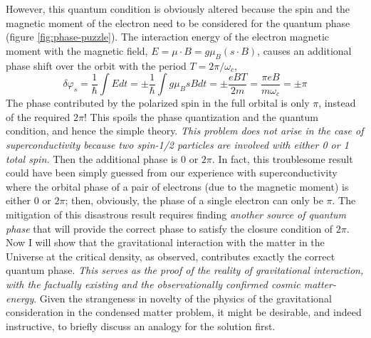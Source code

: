 \documentclass[aps,preprint,12pt,tightenlines]{revtex4}%
\begin{document}
However, this quantum condition is obviously altered because the spin and the
magnetic moment of the electron need to be considered for the quantum phase
(figure \ref{fig:phase-puzzle}). The interaction energy of the electron magnetic
moment with the magnetic field, $E=\mu\cdot B=g\mu_{B}\left(  s\cdot B\right)
$, causes an additional phase shift over the orbit with the period
$T=2\pi/\omega_{c},$%
\begin{equation}
\delta\varphi_{s}=\frac{1}{\hbar}\int Edt=\pm\frac{1}{\hbar}\int g\mu
_{B}sBdt=\pm\frac{eBT}{2m}=\frac{\pi eB}{m\omega_{c}}=\pm\pi
\end{equation}
The phase contributed by the polarized spin in the full orbital is only $\pi$,
instead of the required $2\pi$! This spoils the phase quantization and the
quantum condition, and hence the simple theory. \emph{This problem does not
arise in the case of superconductivity because two spin-1/2 particles are
involved with either 0 or 1 total spin.} Then the additional phase is 0 or
$2\pi$. In fact, this troublesome result could have been simply guessed from
our experience with superconductivity where the orbital phase of a pair of
electrons (due to the magnetic moment) is either 0 or $2\pi$; then, obviously,
the phase of a single electron can only be $\pi$. The mitigation of this
disastrous result requires finding \emph{another source of quantum phase} that
will provide the correct phase to satisfy the closure condition of $2\pi$. Now
I will show that the gravitational interaction with the matter in the Universe
at the critical density, as observed, contributes exactly the correct quantum
phase. \emph{This serves as the proof of the reality of gravitational
interaction, with the factually existing and the observationally confirmed
cosmic matter-energy}. Given the strangeness in novelty of the physics of the
gravitational consideration in the condensed matter problem, it might be
desirable, and indeed instructive, to briefly discuss an analogy for the
solution first.
\end{document}
